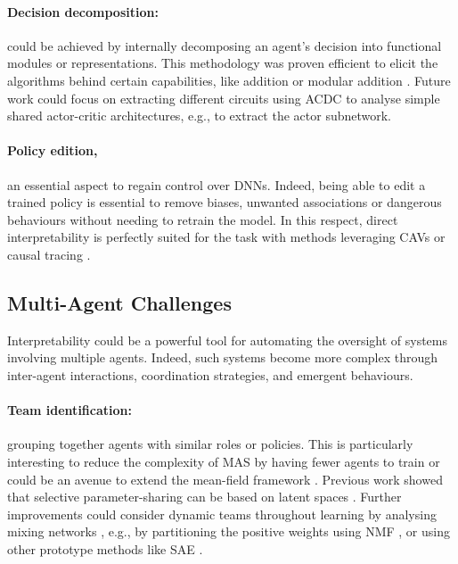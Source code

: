 \paragraph{Decision decomposition:}
could be achieved by internally decomposing an agent's decision into functional modules or representations. This methodology was proven efficient to elicit the algorithms behind certain capabilities, like addition or modular addition \cite{Quirke2023UnderstandingAI,Nanda2023ProgressMF}. Future work could focus on extracting different circuits using ACDC \cite{conmy2023automated} to analyse simple shared actor-critic architectures, e.g., to extract the actor subnetwork.


\paragraph{Policy edition,}an essential aspect to regain control over DNNs. Indeed, being able to edit a trained policy is essential to remove biases, unwanted associations or dangerous behaviours without needing to retrain the model.
In this respect, direct interpretability is perfectly suited for the task with methods leveraging CAVs \cite{Dreyer2023FromHT} or causal
tracing \cite{Meng2022LocatingAE}.

\subsection{Multi-Agent Challenges}

Interpretability could be a powerful tool for automating the oversight of systems involving multiple agents.
Indeed, such systems become more complex through inter-agent interactions, coordination strategies, and emergent behaviours.

\paragraph{Team identification:} grouping together agents with similar roles or policies. This is particularly interesting to reduce the complexity of MAS by having fewer agents to train or could be an avenue to extend the mean-field framework \cite{Yang2018MeanFM}. Previous work showed that selective parameter-sharing can be based on latent spaces \cite{Christianos2021ScalingMR}. Further improvements could consider dynamic teams throughout learning by analysing mixing networks \cite{Rashid2018QMIXMV}, e.g., by partitioning the positive weights using NMF \cite{Paatero1994PositiveMF}, or using other prototype methods like SAE \cite{Cunningham2023SparseAF}.

